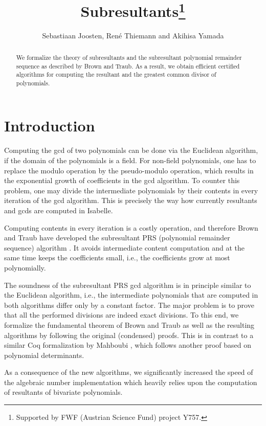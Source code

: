 \documentclass[11pt,a4paper]{article}
\begin{document}
\title{Subresultants\footnote{Supported by FWF (Austrian Science Fund) project Y757.}}
\author{Sebastiaan Joosten, Ren\'e Thiemann and Akihisa Yamada}
\maketitle

\begin{abstract}
We formalize the theory of subresultants and the subresultant polynomial
remainder sequence as described by Brown and Traub. 
As a result, we obtain efficient certified algorithms for computing the resultant
and the greatest common divisor of polynomials. 
\end{abstract}

\tableofcontents

\section{Introduction}

Computing the gcd of two polynomials can be done via the Euclidean algorithm, 
if the domain of the polynomials is a field. For non-field polynomials, one has to
replace the modulo operation by the pseudo-modulo operation, which results in
the exponential growth of coefficients in the gcd algorithm.
To counter this problem, one may divide the 
intermediate polynomials by their contents in every iteration of the gcd algorithm. 
This is precisely the way how currently resultants and gcds are computed in Isabelle.

Computing contents in every iteration is a costly operation, and therefore Brown and
Traub have developed the subresultant PRS (polynomial remainder sequence) algorithm \cite{Brown,BrownTraub}. 
It avoids intermediate content computation and at the same time keeps the coefficients small, i.e., the coefficients grow at most polynomially.

The soundness of the subresultant PRS gcd algorithm is in principle similar to the Euclidean algorithm, i.e., 
the intermediate polynomials that are computed in both algorithms differ only by a constant factor.
The major problem is to prove that all the performed divisions are indeed exact divisions.
To this end, we formalize the fundamental theorem of Brown and Traub as well as the resulting algorithms 
by following the original (condensed) proofs.
This is in contrast to a similar Coq formalization by Mahboubi \cite{Mahboubi06}, which follows another proof 
based on polynomial determinants.

As a consequence of the new algorithms, we significantly increased the speed of the algebraic number implementation \cite{AlgebraicNumbers} which
heavily relies upon the computation of resultants of bivariate polynomials. 







\end{document}
